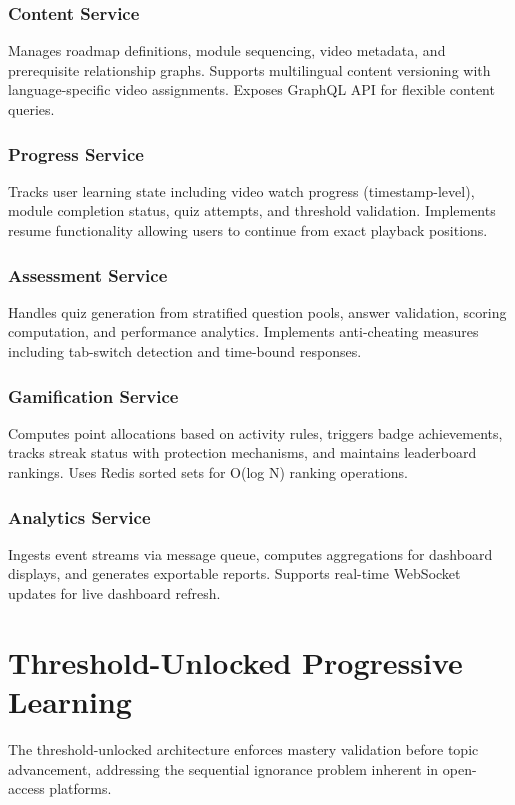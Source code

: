 \documentclass[journal]{IEEEtran}
\begin{document}
\subsubsection{Content Service}
Manages roadmap definitions, module sequencing, video metadata, and prerequisite relationship graphs. Supports multilingual content versioning with language-specific video assignments. Exposes GraphQL API for flexible content queries.

\subsubsection{Progress Service}
Tracks user learning state including video watch progress (timestamp-level), module completion status, quiz attempts, and threshold validation. Implements resume functionality allowing users to continue from exact playback positions.

\subsubsection{Assessment Service}
Handles quiz generation from stratified question pools, answer validation, scoring computation, and performance analytics. Implements anti-cheating measures including tab-switch detection and time-bound responses.

\subsubsection{Gamification Service}
Computes point allocations based on activity rules, triggers badge achievements, tracks streak status with protection mechanisms, and maintains leaderboard rankings. Uses Redis sorted sets for O(log N) ranking operations.

\subsubsection{Analytics Service}
Ingests event streams via message queue, computes aggregations for dashboard displays, and generates exportable reports. Supports real-time WebSocket updates for live dashboard refresh.

\section{Threshold-Unlocked Progressive Learning}
\label{sec:threshold}

The threshold-unlocked architecture enforces mastery validation before topic advancement, addressing the sequential ignorance problem inherent in open-access platforms.
\end{document}
